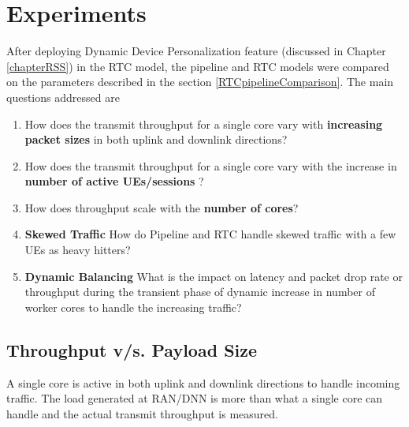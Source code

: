 \section{Experiments \label{sectionExperiments}}
After deploying Dynamic Device Personalization feature (discussed in Chapter \ref{chapterRSS}) in the RTC model, the pipeline and RTC models were compared on the parameters described in the section \ref{RTCpipelineComparison}. The main questions addressed are 
\begin{enumerate}
        \item  How does the transmit throughput for a single core vary with \textbf{increasing packet sizes} in both uplink and downlink directions? 
        \item  How does the transmit throughput for a single core vary with the increase in \textbf{number of active UEs/sessions} ? 
        \item How does throughput scale with the \textbf{number of cores}? 
        \item \textbf{Skewed Traffic} How do Pipeline and RTC handle skewed traffic with a few UEs as heavy hitters?
       \item \textbf{Dynamic Balancing} What is the impact on latency and packet drop rate  or throughput during the transient phase of
        dynamic increase in number of worker cores to handle the increasing traffic? 
\end{enumerate}
\subsection{Throughput v/s. Payload Size \label{subSectiontptPayload}}
A single core is active in both uplink and downlink directions to handle incoming
 traffic. The load generated at RAN/DNN is more than
 what a single core can handle and the actual transmit throughput is measured. 

